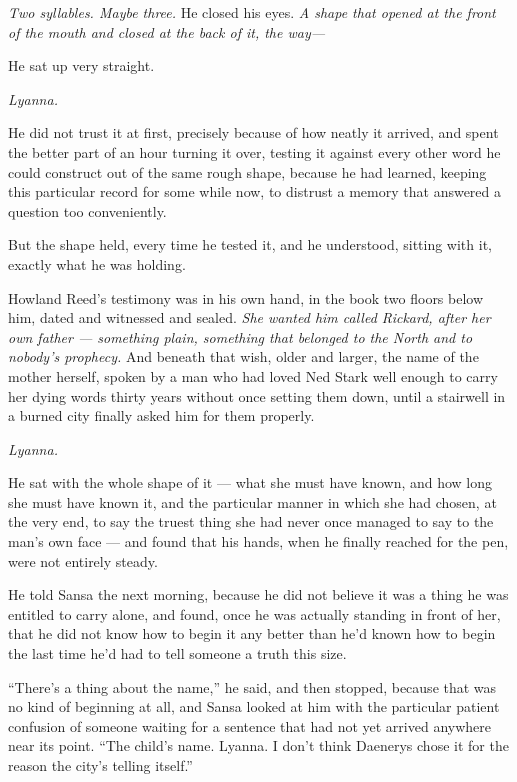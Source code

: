 \textit{Two syllables. Maybe three.} He closed his eyes. \textit{A shape that opened at the front of the mouth and closed at the back of it, the way—}

He sat up very straight.

\textit{Lyanna.}

\sceneBreak

He did not trust it at first, precisely because of how neatly it arrived, and spent the better part of an hour turning it over, testing it against every other word he could construct out of the same rough shape, because he had learned, keeping this particular record for some while now, to distrust a memory that answered a question too conveniently.

But the shape held, every time he tested it, and he understood, sitting with it, exactly what he was holding.

Howland Reed’s testimony was in his own hand, in the book two floors below him, dated and witnessed and sealed. \textit{She wanted him called Rickard, after her own father — something plain, something that belonged to the North and to nobody’s prophecy.} And beneath that wish, older and larger, the name of the mother herself, spoken by a man who had loved Ned Stark well enough to carry her dying words thirty years without once setting them down, until a stairwell in a burned city finally asked him for them properly.

\textit{Lyanna.}

He sat with the whole shape of it — what she must have known, and how long she must have known it, and the particular manner in which she had chosen, at the very end, to say the truest thing she had never once managed to say to the man’s own face — and found that his hands, when he finally reached for the pen, were not entirely steady.

\sceneBreak

He told Sansa the next morning, because he did not believe it was a thing he was entitled to carry alone, and found, once he was actually standing in front of her, that he did not know how to begin it any better than he’d known how to begin the last time he’d had to tell someone a truth this size.

“There’s a thing about the name,” he said, and then stopped, because that was no kind of beginning at all, and Sansa looked at him with the particular patient confusion of someone waiting for a sentence that had not yet arrived anywhere near its point. “The child’s name. Lyanna. I don’t think Daenerys chose it for the reason the city’s telling itself.”

